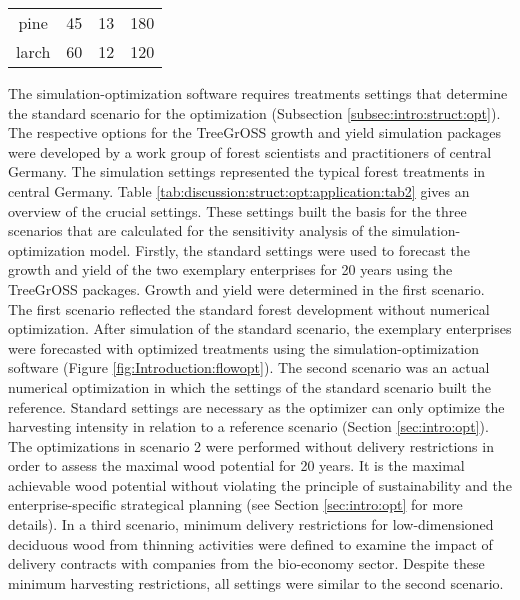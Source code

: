 \begin{table}[h]
\begin{tabular}{cccc}
		pine        & 45                                                                 & 13                                                                                  & 180                                                                                \\
		larch        & 60                                                                 & 12                                                                                  & 120                                                                                \\ \hline
	\end{tabular}
\end{table}

The si\-mu\-la\-tion-op\-ti\-mi\-za\-tion software requires treatments settings that determine the standard scenario for the optimization (Subsection \ref{subsec:intro:struct:opt}). The respective options for the TreeGrOSS growth and yield simulation packages were developed by a work group of forest scientists and practitioners of central Germany. The simulation settings represented the typical forest treatments in central Germany. Table \ref{tab:discussion:struct:opt:application:tab2} gives an overview of the crucial settings. These settings built the basis for the three scenarios that are calculated for the sensitivity analysis of the simulation-optimization model. Firstly, the standard settings were used to forecast the growth and yield of the two exemplary enterprises for 20 years using the TreeGrOSS packages. Growth and yield were determined in the first scenario. The first scenario reflected the standard forest development without numerical optimization. After simulation of the standard scenario, the exemplary enterprises were forecasted with optimized treatments using the si\-mu\-la\-tion-op\-ti\-mi\-za\-tion software (Figure \ref{fig:Introduction:flowopt}). The second scenario was an actual numerical optimization in which the settings of the standard scenario built the reference. Standard settings are necessary as the optimizer can only optimize the harvesting intensity in relation to a reference scenario (Section \ref{sec:intro:opt}). The optimizations in scenario 2 were performed without delivery restrictions in order to assess the maximal wood potential for 20 years. It is the maximal achievable wood potential without violating the principle of sustainability and the enterprise-specific strategical planning (see Section \ref{sec:intro:opt} for more details). In a third scenario, minimum delivery restrictions for low-dimensioned deciduous wood from thinning activities were defined to examine the impact of delivery contracts with companies from the bio-economy sector. Despite these minimum harvesting restrictions, all settings were similar to the second scenario.

